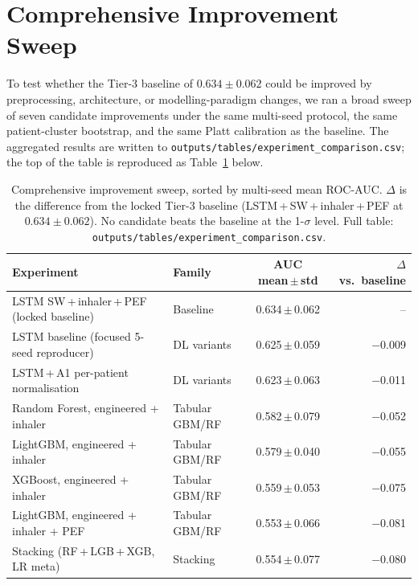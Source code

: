\documentclass[11pt,a4paper]{article}
\begin{document}
\section{Comprehensive Improvement Sweep}\label{sec:improvement_sweep}

To test whether the Tier-3 baseline of $0.634\pm0.062$ could be improved
by preprocessing, architecture, or modelling-paradigm changes, we ran a
broad sweep of seven candidate improvements under the same multi-seed
protocol, the same patient-cluster bootstrap, and the same Platt
calibration as the baseline.  The aggregated results are written to
\texttt{outputs/tables/experiment\_comparison.csv}; the top of the table
is reproduced as Table~\ref{tab:experiment_comparison} below.

\begin{table}[H]
\centering
\caption{Comprehensive improvement sweep, sorted by multi-seed mean
ROC-AUC.  $\Delta$ is the difference from the locked Tier-3 baseline
(LSTM\,+\,SW\,+\,inhaler\,+\,PEF at $0.634\pm0.062$).  No candidate beats
the baseline at the 1-$\sigma$ level.  Full table:
\texttt{outputs/tables/experiment\_comparison.csv}.}
\label{tab:experiment_comparison}
\small
\begin{tabular}{llcr}
\toprule
\textbf{Experiment} & \textbf{Family} & \textbf{AUC mean\,$\pm$\,std} & \textbf{$\Delta$ vs.\ baseline} \\
\midrule
LSTM SW\,+\,inhaler\,+\,PEF (locked baseline) & Baseline             & 0.634\,$\pm$\,0.062 & --       \\
LSTM baseline (focused 5-seed reproducer)     & DL variants          & 0.625\,$\pm$\,0.059 & $-$0.009 \\
LSTM\,+\,A1 per-patient normalisation         & DL variants          & 0.623\,$\pm$\,0.063 & $-$0.011 \\
Random Forest, engineered + inhaler           & Tabular GBM/RF       & 0.582\,$\pm$\,0.079 & $-$0.052 \\
LightGBM, engineered + inhaler                & Tabular GBM/RF       & 0.579\,$\pm$\,0.040 & $-$0.055 \\
XGBoost, engineered + inhaler                 & Tabular GBM/RF       & 0.559\,$\pm$\,0.053 & $-$0.075 \\
LightGBM, engineered + inhaler + PEF          & Tabular GBM/RF       & 0.553\,$\pm$\,0.066 & $-$0.081 \\
Stacking (RF\,+\,LGB\,+\,XGB, LR meta)        & Stacking             & 0.554\,$\pm$\,0.077 & $-$0.080 \\
\bottomrule
\end{tabular}
\end{table}
\end{document}
